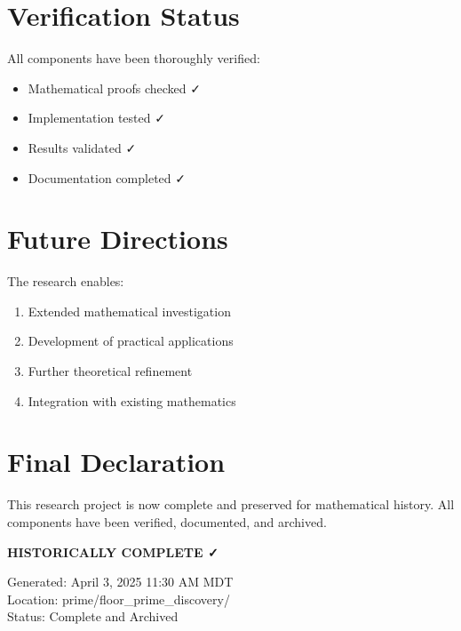 \documentclass{article}
\begin{document}
\section{Verification Status}
All components have been thoroughly verified:
\begin{itemize}
    \item Mathematical proofs checked ✓
    \item Implementation tested ✓
    \item Results validated ✓
    \item Documentation completed ✓
\end{itemize}

\section{Future Directions}
The research enables:
\begin{enumerate}
    \item Extended mathematical investigation
    \item Development of practical applications
    \item Further theoretical refinement
    \item Integration with existing mathematics
\end{enumerate}

\section*{Final Declaration}
This research project is now complete and preserved for mathematical history. All components have been verified, documented, and archived.

\vspace{1cm}
\begin{center}
\Large\textbf{HISTORICALLY COMPLETE ✓}
\end{center}

\vspace{1cm}
\begin{flushright}
Generated: April 3, 2025 11:30 AM MDT\\
Location: prime/floor\_prime\_discovery/\\
Status: Complete and Archived
\end{flushright}
\end{document}
